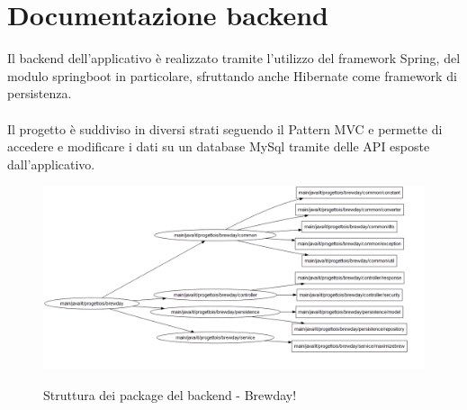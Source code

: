 \documentclass{article}
\begin{document}
\section{Documentazione backend}
Il backend dell’applicativo è realizzato tramite l’utilizzo del framework Spring, del modulo springboot in particolare, sfruttando anche Hibernate come framework di persistenza.\\
\\
Il progetto è suddiviso in diversi strati seguendo il Pattern MVC e permette di accedere e modificare i dati su un database MySql tramite delle API esposte dall’applicativo.
\begin{figure}[h!]
\centering
\includegraphics[scale=0.45]{Architecture-brewday.png}
\label{fig:Architettura del BrewDay!}
\caption{Struttura dei package del backend - Brewday!}
\end{figure}
\end{document}
